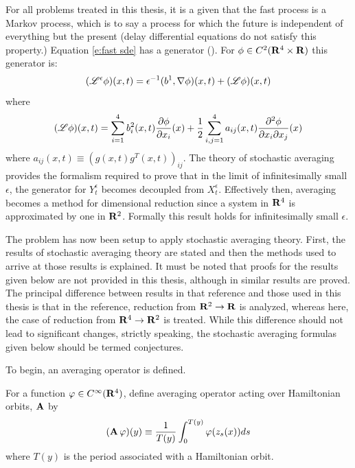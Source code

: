 For all problems treated in this thesis, it is a given that the fast process is a Markov process, which is to say a process for which the future is independent of everything but the present (delay differential equations do not satisfy this property.) Equation \eqref{e:fast sde} has a generator (\citep[\S 7.3]{oksendal98:_stoch_differ_equat}). For $\phi \in C^2(\mathbf R^4 \times \mathbf R)$ this generator is:
\[
(\mathscr L^\epsilon \phi)(x,t) = \epsilon^{-1} (b^1,\nabla \phi)(x,t) + (\mathscr L \phi)(x,t)
\]
where
\[
(\mathscr L \phi)(x,t) = \sum_{i = 1}^4 b_i^2(x,t) \frac{\partial \phi}{\partial x_i}(x) + \frac12 \sum_{i,j=1}^4 a_{ij}(x,t) \frac{\partial^2 \phi}{\partial x_i \partial x_j}(x)
\]
where $a_{ij}(x,t) \equiv (g(x,t) g^T(x,t))_{ij}$. The theory of stochastic averaging provides the formalism required to prove that in the limit of infinitesimally small $\epsilon$, the generator for
$Y_t^\epsilon$ becomes decoupled from $X_t^\epsilon$. Effectively then, averaging becomes a method for dimensional reduction since a system in $\mathbf R^4$ is approximated by one in $\mathbf R^2$. Formally this result holds for infinitesimally small $\epsilon$.

The problem has now been setup to apply stochastic averaging theory. First, the results of stochastic averaging theory are stated and then the methods used to arrive at those results is explained. It must be noted that proofs for the results given below are not provided in this thesis, although in \citet{namachchivaya01:_unified_approac_noisy_nonlin_mathieu_type_system} similar results are proved. The principal difference between results in that reference and those used in this thesis is that in the reference, reduction from $\mathbf R^2 \to \mathbf R$ is analyzed, whereas here, the case of reduction from $\mathbf R^4 \to \mathbf R^2$ is treated. While this difference should not lead to significant changes, strictly speaking, the stochastic averaging formulas given below should be termed conjectures.

To begin, an averaging operator is defined.
\begin{definition}
\label{d:Aave}
For a function $\varphi \in C^\infty(\mathbf R^4)$, define averaging operator acting over Hamiltonian orbits, $\operatorname{\mathbf A}$ by
\[
(\operatorname{\mathbf A} \varphi) (y) \equiv \frac{1}{T(y)} \int_0^{T(y)} \varphi(z_s(x)) ds
\]
where $T(y)$ is the period associated with a Hamiltonian orbit.
\end{definition}

